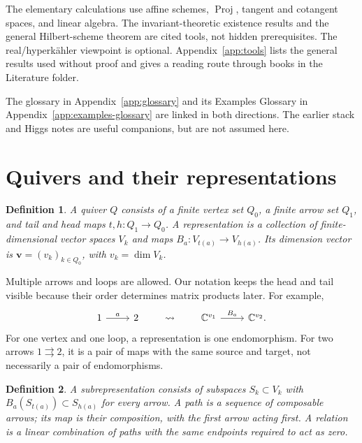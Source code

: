 \documentclass[11pt,a4paper]{article}
\numberwithin{equation}{section}
\newtheorem{definition}{Definition}[section]
\theoremstyle{definition}
\newcommand{\Proj}{\operatorname{Proj}}
\newcommand{\vv}{\mathbf v}
\begin{document}
The elementary calculations use affine schemes, $\Proj$, tangent and
cotangent spaces, and linear algebra. The invariant-theoretic existence
results and the general Hilbert-scheme theorem are cited tools, not
hidden prerequisites. The real/hyperkähler viewpoint is optional.
Appendix~\ref{app:tools} lists the general results used without proof
and gives a reading route through books in the Literature folder.

The glossary in Appendix~\ref{app:glossary} and its Examples Glossary
in Appendix~\ref{app:examples-glossary} are linked in both directions.
The earlier stack and Higgs notes are useful companions, but are not
assumed here.

\section{Quivers and their representations}
\label{sec:quivers}

\begin{definition}
A quiver $Q$ consists of a finite vertex set $Q_0$, a finite arrow set
$Q_1$, and tail and head maps $t,h:Q_1\to Q_0$. A representation is
a collection of finite-dimensional vector spaces $V_k$ and maps
$B_a:V_{t(a)}\to V_{h(a)}$. Its dimension vector is
$\vv=(v_k)_{k\in Q_0}$, with $v_k=\dim V_k$.
\end{definition}

Multiple arrows and loops are allowed. Our notation keeps the head and
tail visible because their order determines matrix products later.
For example,
\[
\begin{tikzcd}
 1\arrow[r,"a"] &2
\end{tikzcd}
\qquad\leadsto\qquad
\begin{tikzcd}
 \mathbb C^{v_1}\arrow[r,"B_a"]&\mathbb C^{v_2}.
\end{tikzcd}
\]
For one vertex and one loop, a representation is one endomorphism.
For two arrows $1\rightrightarrows2$, it is a pair of maps with the
same source and target, not necessarily a pair of endomorphisms.

\begin{definition}
A subrepresentation consists of subspaces $S_k\subset V_k$ with
$B_a(S_{t(a)})\subset S_{h(a)}$ for every arrow. A path is a sequence
of composable arrows; its map is their composition, with the first
arrow acting first. A relation is a linear combination of paths with
the same endpoints required to act as zero.
\end{definition}
\end{document}
